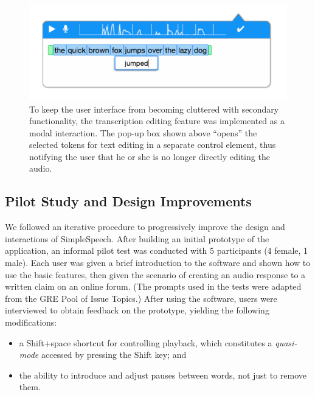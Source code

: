 \begin{figure}
	\centering
	\includegraphics[width=\columnwidth,keepaspectratio]{figures/transcription_edit}
	\caption{To keep the user interface from becoming cluttered with secondary functionality, the transcription editing feature was implemented as a modal interaction. The pop-up box shown above ``opens'' the selected tokens for text editing in a separate control element, thus notifying the user that he or she is no longer directly editing the audio.}
	\label{fig:transcription}
\end{figure}

\subsection{Pilot Study and Design Improvements}
We followed an iterative procedure to progressively improve the design and interactions of SimpleSpeech.
After building an initial prototype of the application, an informal pilot test was conducted with 5 participants (4 female, 1 male). 
Each user was given a brief introduction to the software and shown how to use the basic features, then given the scenario of creating an audio response to a written claim on an online forum. 
(The prompts used in the tests were adapted from the GRE Pool of Issue Topics.)
After using the software, users were interviewed to obtain feedback on the prototype, yielding the following modifications:

\begin{itemize}
\item a Shift+space shortcut for controlling playback, which constitutes a \emph{quasi-mode} accessed by pressing the Shift key; and
\item the ability to introduce and adjust pauses between words, not just to remove them.
\end{itemize}